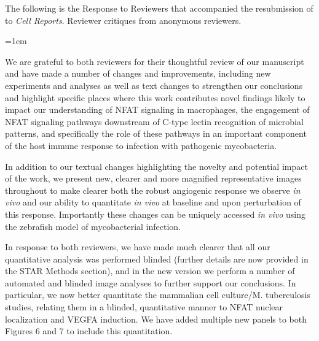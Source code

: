 The following is the Response to Reviewers that accompanied the resubmission of \citet{Brewer2022} to \textit{Cell Reports}. Reviewer critiques from anonymous reviewers.

\emergencystretch=1em

                    
\begin{description}[style=multiline, labelwidth=\widthof{Reviewer \#2:   }, font=\normalfont, leftmargin=\labelwidth, align=right]
                    
\item[Response: ] \quad We are grateful to both reviewers for their thoughtful review of our manuscript and have made a number of changes and improvements, including new experiments and analyses as well as text changes to strengthen our conclusions and highlight specific places where this work contributes novel findings likely to impact our understanding of NFAT signaling in macrophages, the engagement of NFAT signaling pathways downstream of C\hyp{}type lectin recognition of microbial patterns, and specifically the role of these pathways in an important component of the host immune response to infection with pathogenic mycobacteria.

\item \quad In addition to our textual changes highlighting the novelty and potential impact of the work, we present new, clearer and more magnified representative images throughout to make clearer both the robust angiogenic response we observe \textit{in vivo} and our ability to quantitate \textit{in vivo} at baseline and upon perturbation of this response. Importantly these changes can be uniquely accessed \textit{in vivo} using the zebrafish model of mycobacterial infection.

\item \quad In response to both reviewers, we have made much clearer that all our quantitative analysis was performed blinded (further details are now provided in the STAR Methods section), and in the new version we perform a number of automated and blinded image analyses to further support our conclusions. In particular, we now better quantitate the mammalian cell culture/M. tuberculosis studies, relating them in a blinded, quantitative manner to NFAT nuclear localization and VEGFA induction. We have added multiple new panels to both Figures 6 and 7 to include this quantitation.


\end{description}
